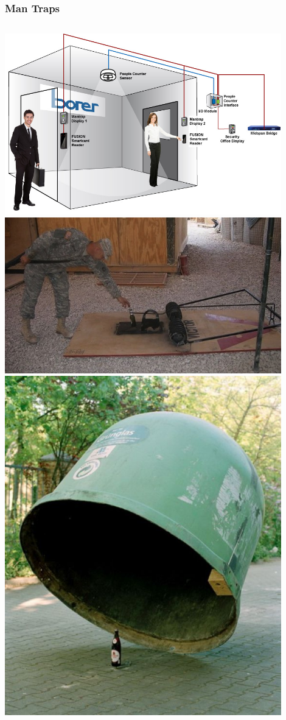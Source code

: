 \documentclass[]{beamer}
\begin{document}
\begin{frame}
  \frametitle{Man Traps}
  \begin{columns}
    \includegraphics[width=0.9\textwidth]{access-control-mantrap}
    \includegraphics[width=0.9\textwidth]{Man-Trap-1}
    \includegraphics[width=0.9\textwidth]{Man-Trap-2}
  \end{columns}
\end{frame}
\end{document}

